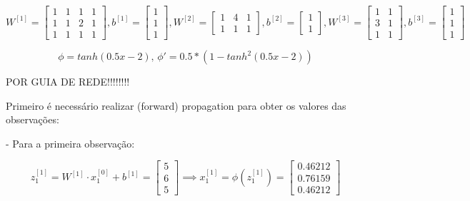 \documentclass[a4paper,12pt]{article} %
\begin{document}
\begin{enumerate}
\begin{equation*}
    W^{[1]} = \begin{bmatrix} 1 & 1 & 1 & 1 \\ 1 & 1 & 2 & 1 \\ 1 & 1 & 1 & 1 \end{bmatrix} , b^{[1]} = \begin{bmatrix} 1 \\ 1 \\ 1 \end{bmatrix}, W^{[2]} = \begin{bmatrix} 1 & 4 & 1 \\  1 & 1 & 1 \end{bmatrix} , b^{[2]} = \begin{bmatrix} 1 \\ 1 \end{bmatrix}, W^{[3]} = \begin{bmatrix} 1 & 1 \\ 3 & 1 \\ 1 & 1 \end{bmatrix} , b^{[3]} = \begin{bmatrix} 1 \\ 1 \\ 1 \end{bmatrix}
\end{equation*}

\begin{equation*}
    \phi = tanh(0.5x -2) \text{, } \phi' = 0.5 * (1 - tanh^2(0.5x -2))
\end{equation*}

POR GUIA DE REDE!!!!!!!!


Primeiro é necessário realizar (forward) propagation para obter os valores das observações:

- Para a primeira observação:

\begin{equation*}
    z^{[1]}_1 = W^{[1]} \cdot x^{[0]}_1 + b^{[1]} = \begin{bmatrix} 5 \\ 6 \\ 5 \end{bmatrix} \implies x^{[1]}_1 = \phi(z^{[1]}_1)= \begin{bmatrix} 0.46212 \\ 0.76159 \\ 0.46212 \end{bmatrix}
\end{equation*}


\end{enumerate}
\end{document}
